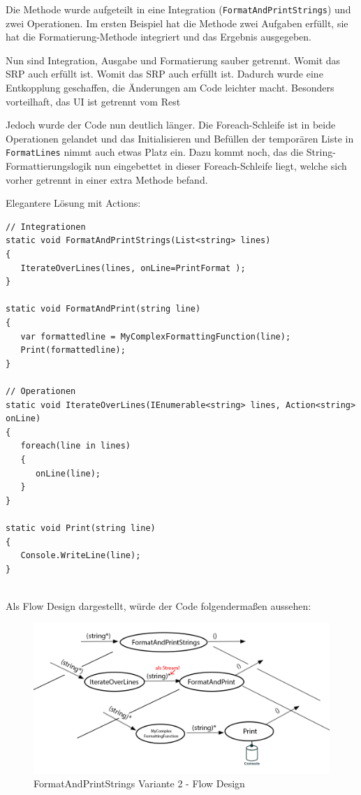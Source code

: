Die Methode wurde aufgeteilt in eine Integration (\texttt{FormatAndPrintStrings}) und zwei Operationen.
Im ersten Beispiel hat die Methode zwei Aufgaben erfüllt, sie hat die Formatierung-Methode integriert und
das Ergebnis ausgegeben.

Nun sind Integration, Ausgabe und Formatierung sauber getrennt. Womit das SRP
auch erfüllt ist. Womit das SRP auch erfüllt ist. Dadurch wurde eine Entkopplung geschaffen, 
die Änderungen am Code leichter macht. Besonders vorteilhaft, das UI ist getrennt vom Rest

Jedoch wurde der Code nun deutlich länger. Die Foreach-Schleife ist in beide Operationen gelandet und das Initialisieren und
Befüllen der temporären Liste in \texttt{FormatLines} nimmt auch etwas Platz ein.
Dazu kommt noch, das die String-Formattierungslogik nun eingebettet in dieser Foreach-Schleife liegt, welche sich vorher getrennt in
einer extra Methode  befand.

\bigskip

Elegantere Lösung mit Actions:

\begin{lstlisting}[caption=FormatAndPrintStrings Variante 2]
// Integrationen
static void FormatAndPrintStrings(List<string> lines)
{
   IterateOverLines(lines, onLine=PrintFormat );
}

static void FormatAndPrint(string line)
{
   var formattedline = MyComplexFormattingFunction(line);
   Print(formattedline);
}

// Operationen
static void IterateOverLines(IEnumerable<string> lines, Action<string> onLine)
{
   foreach(line in lines)
   {
      onLine(line);
   }
}

static void Print(string line)
{
   Console.WriteLine(line);
}


\end{lstlisting}

Als Flow Design dargestellt, würde der Code folgendermaßen aussehen:

\begin{figure}[H]
	\centering
	\includegraphics[width=1\linewidth]{./img/FlowsForeach.png}
	\caption{FormatAndPrintStrings Variante 2 - Flow Design}
\end{figure}




